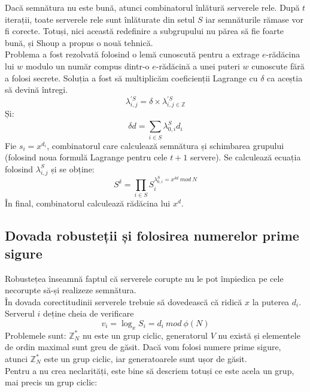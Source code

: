 \documentclass[12]{article}
\begin{document}
Dacă semnătura nu este bună, atunci combinatorul înlătură serverele rele. După $t$ iterații, toate serverele rele sunt înlăturate din setul $S$ iar semnăturile rămase vor fi corecte. Totuși, nici această redefinire a subgrupului nu părea să fie foarte bună, și Shoup a propus o nouă tehnică. \\
Problema a fost rezolvată folosind o lemă cunoscută pentru a extrage $e$-rădăcina lui $w$ modulo un număr compus dintr-o $e$-rădăcină a unei puteri $w$ cunoscute fără a folosi secrete. Soluția a fost să multiplicăm coeficienții Lagrange cu $\delta$ ca aceștia să devină întregi. 
$$ \lambda_{i,j}^{'S} = \delta \times \lambda_{i,j \in \mathbb{Z}}^{'S} $$
Și:
$$ \delta d = \sum_{i \in S}^{} \lambda_{0,i}^{S} d_i $$
Fie $ s_i = x^{d_i} $, combinatorul care calculează semnătura și schimbarea grupului (folosind noua formulă Lagrange pentru cele $t+1$ servere). Se calculează ecuația folosind $\lambda_{i,j}^{S} $ și se obține:
$$S^{\delta} = \prod_{i \in S}^{} S_{i}^{\lambda_{0,i}^{S} = x^{\delta d} \ mod \ N}$$
În final, combinatorul calculează rădăcina lui $x^d$.

\subsection{Dovada robusteții și folosirea numerelor prime sigure}
Robustețea înseamnă faptul că serverele corupte nu le pot împiedica pe cele necorupte să-și realizeze semnătura. \\
În dovada corectitudinii serverele trebuie să dovedească că ridică $x$ la puterea $d_i$. Serverul $i$ deține cheia de verificare
$$ v_i = \log_{x} S_i = d_i \ mod \ \phi(N)$$
Problemele sunt: $\mathbb{Z}_{N}^{*}$ nu este un grup ciclic,  generatorul $V$ nu există și elementele de ordin maximal sunt greu de găsit. Dacă vom folosi numere prime sigure, atunci $\mathbb{Z}_{N}^{*}$ este un grup ciclic, iar generatoarele sunt ușor de găsit. \\
Pentru a nu crea neclarități, este bine să descriem totuși ce este acela un grup, mai precis un grup ciclic: 
\end{document}
